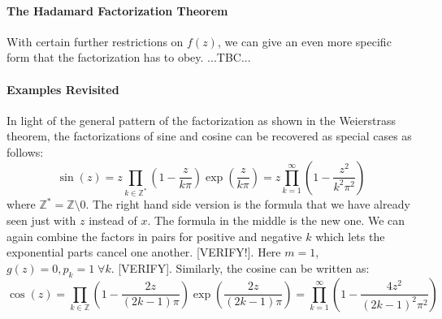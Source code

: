 
\paragraph{The Hadamard Factorization Theorem}
With certain further restrictions on $f(z)$, we can give an even more specific form that the factorization has to obey. ...TBC...


\paragraph{Examples Revisited}
In light of the general pattern of the factorization as shown in the Weierstrass theorem, the factorizations of sine and cosine can be recovered as special cases as follows:
\begin{equation}
\sin(z) = z \prod_{k \in \mathbb{Z}^*} 
          \left( 1 - \frac{z}{k \pi} \right) \exp \left(\frac{z}{k \pi} \right)
        = z \prod_{k=1}^{\infty} \left( 1 - \frac{z^2}{k^2 \pi^2}  \right)
\end{equation}
where $\mathbb{Z}^* = \mathbb{Z} \setminus 0$. The right hand side version is the formula that we have already seen just with $z$ instead of $x$. The formula in the middle is the new one. We can again combine the factors in pairs for positive and negative $k$ which lets the exponential parts cancel one another. [VERIFY!]. Here $m = 1$, $g(z) = 0, p_k = 1 \; \forall k$. [VERIFY]. Similarly, the cosine can be written as: 
\begin{equation}
\cos(z) = \prod_{k \in \mathbb{Z}} 
          \left(1 - \frac{2 z}{(2k-1) \pi} \right) \exp \left(\frac{2z}{(2k-1) \pi} \right)
        = \prod_{k=1}^{\infty} \left( 1 - \frac{4 z^2}{(2k - 1)^2 \pi^2}  \right)
\end{equation}







